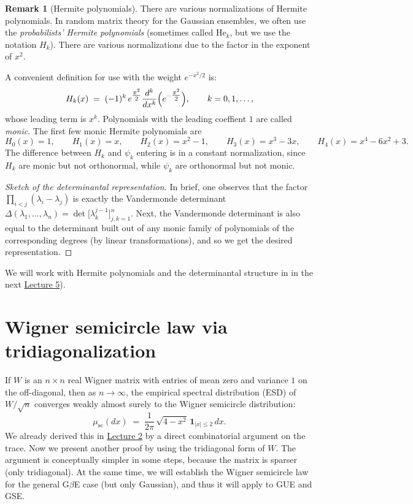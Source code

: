 \documentclass[letterpaper,11pt,oneside,reqno]{article}
\numberwithin{equation}{section}
\theoremstyle{definition}
\newtheorem{remark}[proposition]{Remark}
\begin{document}
\begin{remark}[Hermite polynomials]
  There are various normalizations of Hermite polynomials.
  In random matrix theory for the Gaussian ensembles,
  we often use the \emph{probabilists' Hermite polynomials}
	(sometimes called \(\mathrm{He}_k\), but we use the notation $H_k$).
	There are various normalizations due to the factor in the exponent
	of $x^2$.

  A convenient definition for use with the weight \(e^{-x^2/2}\) is:
  \[
    H_k(x)
    \;=\;
    (-1)^k\, e^{\tfrac{x^2}{2}}
    \frac{d^k}{dx^k}
    \Bigl(e^{-\tfrac{x^2}{2}}\Bigr),
		\qquad
		k=0,1,\ldots,
  \]
  whose leading term is \(x^k\).
	Polynomials with the leading coeffient \(1\) are called \emph{monic}.
	The first few monic Hermite polynomials are
	\[
		H_0(x) = 1,\qquad
		H_1(x) = x,\qquad
		H_2(x) = x^2 - 1,\qquad
		H_3(x) = x^3 - 3x,\qquad
		H_4(x) = x^4 - 6x^2 + 3.
	\]
	The difference between $H_k$ and $\psi_k$ entering 
	is in a constant normalization,
	since $H_k$ are monic but not orthonormal,
	while $\psi_k$ are orthonormal but not monic.
\end{remark}

\begin{proof}[Sketch of the determinantal representation]
  In brief, one observes that the factor
  \(\prod_{i<j}(\lambda_i - \lambda_j)\)
  is exactly the Vandermonde determinant
  \(\Delta(\lambda_1,\dots,\lambda_n)
  = \det\bigl[\lambda_k^{j-1}\bigr]_{j,k=1}^n\).
	Next, the Vandermonde determinant is also equal to
	the determinant built out of any monic family of polynomials of the corresponding
	degrees (by linear transformations), and so we get the desired
	representation.
\end{proof}

We will work with Hermite polynomials
and the determinantal structure in 
in the next
\href{https://lpetrov.cc/rmt25/rmt25-notes/rmt2025-l05.pdf}{Lecture 5}).

\section{Wigner semicircle law via tridiagonalization}
\label{sec:semicircle-tridiagonal}


If $W$ is an $n\times n$ real Wigner matrix with entries of
mean zero and variance $1$ on the off-diagonal, then as
$n\to\infty$, the empirical spectral distribution (ESD) of
$W/\sqrt{n}$ converges weakly almost surely to the Wigner
semicircle distribution:
\[
  \mu_{\mathrm{sc}}(dx)
  \;=\;
  \frac{1}{2\pi}\,\sqrt{4 - x^2}\,\mathbf{1}_{|x|\le2}\,dx.
\]
We already derived this in
\href{https://lpetrov.cc/rmt25/rmt25-notes/rmt2025-l02.pdf}{Lecture 2}
by a direct combinatorial argument on the trace. Now we present another proof by using the tridiagonal form of $W$.  The argument is conceptually simpler in some steps, because the matrix is sparser (only tridiagonal).
At the same time, we will establish the Wigner
semicircle law for the general G$\beta$E case (but only Gaussian), and
thus it will apply to GUE and GSE.
\end{document}

